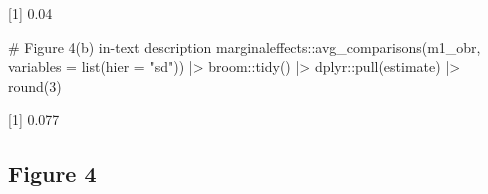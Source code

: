 \documentclass[
  12,
  letterpaper,
  DIV=11,
  numbers=noendperiod]{scrartcl}
\newenvironment{Shaded}{\begin{snugshade}}{\end{snugshade}}
\newcommand{\AttributeTok}[1]{\textcolor[rgb]{0.40,0.45,0.13}{#1}}
\newcommand{\CommentTok}[1]{\textcolor[rgb]{0.37,0.37,0.37}{#1}}
\newcommand{\DecValTok}[1]{\textcolor[rgb]{0.68,0.00,0.00}{#1}}
\newcommand{\FunctionTok}[1]{\textcolor[rgb]{0.28,0.35,0.67}{#1}}
\newcommand{\NormalTok}[1]{\textcolor[rgb]{0.00,0.23,0.31}{#1}}
\newcommand{\SpecialCharTok}[1]{\textcolor[rgb]{0.37,0.37,0.37}{#1}}
\newcommand{\StringTok}[1]{\textcolor[rgb]{0.13,0.47,0.30}{#1}}
\begin{document}
\begin{Shaded}
\begin{Highlighting}[numbers=left,,]
\NormalTok{[1] 0.04}
\end{Highlighting}
\end{Shaded}

\begin{Shaded}
\begin{Highlighting}[numbers=left,,]
\CommentTok{\# Figure 4(b) in{-}text description}
\NormalTok{marginaleffects}\SpecialCharTok{::}\FunctionTok{avg\_comparisons}\NormalTok{(m1\_obr, }\AttributeTok{variables =} \FunctionTok{list}\NormalTok{(}\AttributeTok{hier =} \StringTok{"sd"}\NormalTok{)) }\SpecialCharTok{|\textgreater{}}\NormalTok{ broom}\SpecialCharTok{::}\FunctionTok{tidy}\NormalTok{() }\SpecialCharTok{|\textgreater{}}\NormalTok{ dplyr}\SpecialCharTok{::}\FunctionTok{pull}\NormalTok{(estimate) }\SpecialCharTok{|\textgreater{}} \FunctionTok{round}\NormalTok{(}\DecValTok{3}\NormalTok{)}
\end{Highlighting}
\end{Shaded}

\begin{Shaded}
\begin{Highlighting}[numbers=left,,]
\NormalTok{[1] 0.077}
\end{Highlighting}
\end{Shaded}

\newpage

\subsection{Figure 4}\label{figure-4}
\end{document}
